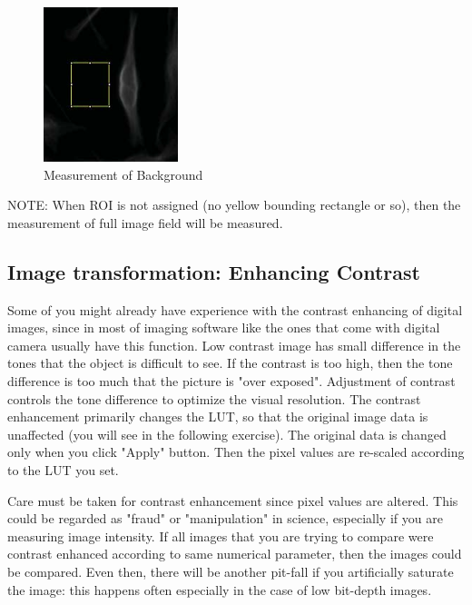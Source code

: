 \begin{indentexercise}{1}
\begin{figure}[htbp]
\begin{center}
\includegraphics[height=4.5cm]{img/CMCIBasicCourse201102-img35.jpg}
\caption{Measurement of Background}
\label{fig:img35}
\end{center}
\end{figure}

\end{indentexercise}

NOTE: When ROI is not assigned (no yellow bounding rectangle or so),
then the measurement of full image field will be measured.

\subsection{Image transformation: Enhancing Contrast}
\label{subsec:enhancecontrast}
Some of you might already have experience with the contrast enhancing of
digital images, since in most of imaging software like the ones that
come with digital camera usually have this function. Low contrast image
has small difference in the tones that the object is difficult to see.
If the contrast is too high, then the tone difference is too much that
the picture is "over exposed".
Adjustment of contrast controls the tone difference to optimize the
visual resolution. The contrast enhancement primarily changes the LUT,
so that the original image data is unaffected (you will see in the
following exercise). The original data is changed only when you click
"Apply" button. Then the pixel values
are re-scaled according to the LUT you set.



Care must be taken for contrast enhancement since pixel values are
altered. This could be regarded as
"fraud" or
"manipulation" in science, especially if
you are measuring image intensity. If all images that you are trying to
compare were contrast enhanced according to same numerical parameter,
then the images could be compared. Even then, there will be another
pit-fall if you artificially saturate the image: this happens often
especially in the case of low bit-depth images. 

